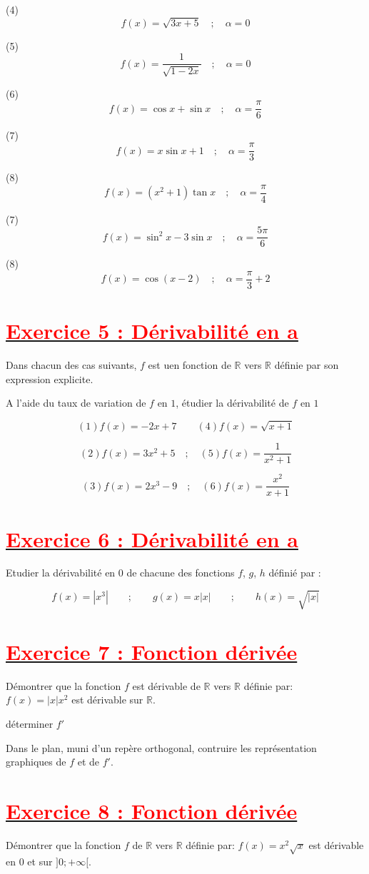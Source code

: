 \documentclass[12pt]{article}
\begin{document}
(4) \[f(x)=\sqrt{3x+5}\quad ;\quad \alpha =0\]

(5) \[f(x)=\frac{1}{\sqrt{1-2x}}\quad ;\quad \alpha =0\]

(6) \[f(x)=\cos x +\sin x\quad ;\quad \alpha =\frac{\pi}{6}\]

(7) \[f(x)=x\sin x +1\quad ;\quad \alpha =\frac{\pi}{3}\]

(8) \[f(x)=(x^{2}+1)\tan x\quad ;\quad \alpha =\frac{\pi}{4}\]

(7) \[f(x)=\sin^{2}x-3\sin x\quad ;\quad \alpha =\frac{5\pi}{6}\]

(8) \[f(x)=\cos(x-2)\quad ;\quad \alpha = \frac{\pi}{3}+2 \]
\section*{\underline{\textbf{\textcolor{red}{Exercice 5 : Dérivabilité en a}}}}
Dans chacun des cas suivants, $f$ est uen fonction de $\mathbb{R}$ vers $\mathbb{R}$ définie par son expression explicite.

A l'aide du taux de variation de $f$ en $1$, étudier la dérivabilité de $f$ en $1$

\[(1) f(x)=-2x+7\quad \quad (4)f(x)=\sqrt{x+1}\]

\[(2) f(x)=3x^{2}+5\quad ;\quad (5)f(x)=\frac{1}{x^{2}+1}\]

\[(3) f(x)=2x^{3}-9\quad ;\quad (6)f(x)=\frac{x^{2}}{x+1}\]
\section*{\underline{\textbf{\textcolor{red}{Exercice 6 : Dérivabilité en a}}}}
Etudier la dérivabilité en $0$ de chacune des fonctions $f$, $g$, $h$ définié par :

\[f(x)=|x^{3}|\quad\quad ;\quad\quad g(x)=x|x|\quad\quad ;\quad\quad h(x)=\sqrt{|x|}\]

\section*{\underline{\textbf{\textcolor{red}{Exercice 7 : Fonction dérivée}}}}
Démontrer que la fonction $f$ est dérivable de $\mathbb{R}$ vers $\mathbb{R}$ définie par:\\
$f(x)=|x|x^{2}$ est dérivable sur $\mathbb{R}$.

déterminer $f'$

Dans le plan, muni d'un repère orthogonal, contruire les représentation graphiques de $f$ et de $f'$.
\section*{\underline{\textbf{\textcolor{red}{Exercice 8 : Fonction dérivée}}}}
Démontrer que la fonction $f$ de $\mathbb{R}$ vers $\mathbb{R}$ définie par: $f(x)=x^{2}\sqrt{x}$ est dérivable en $0$ et sur $]0; +\infty[$. 
\end{document}
